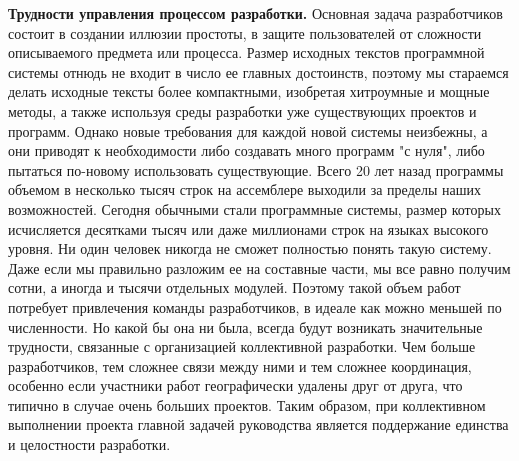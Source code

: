 \documentclass[a4paper,12pt]{article}
\begin{document}
\begin{small}
\textbf{Трудности управления процессом разработки.} Основная задача разработчиков состоит в создании иллюзии простоты, в защите пользователей от сложности описываемого предмета или процесса. Размер исходных текстов программной системы отнюдь не входит в число ее главных достоинств, поэтому мы стараемся делать исходные тексты более компактными, изобретая хитроумные и мощные методы, а также используя среды разработки уже существующих проектов и программ. Однако новые требования для каждой новой системы неизбежны, а они приводят к необходимости либо создавать много программ "с нуля", либо пытаться по-новому использовать существующие. Всего 20 лет назад программы объемом в несколько тысяч строк на ассемблере выходили за пределы наших возможностей. Сегодня обычными стали программные системы, размер которых исчисляется десятками тысяч или даже миллионами строк на языках высокого уровня. Ни один человек никогда не сможет полностью понять такую систему. Даже если мы правильно разложим ее на составные части, мы все равно получим сотни, а иногда и тысячи отдельных модулей. Поэтому такой объем работ потребует привлечения команды разработчиков, в идеале как можно меньшей по численности. Но какой бы она ни была, всегда будут возникать значительные трудности, связанные с организацией коллективной разработки. Чем больше разработчиков, тем сложнее связи между ними и тем сложнее координация, особенно если участники работ географически удалены друг от друга, что типично в случае очень больших проектов. Таким образом, при коллективном выполнении проекта главной задачей руководства является поддержание единства и целостности разработки. \par \medskip


\end{small}
\end{document}
